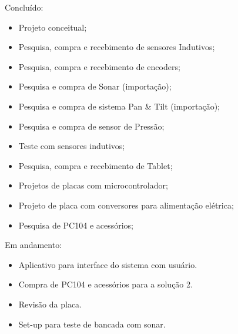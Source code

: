 Concluído:
\begin{itemize}
  \item Projeto conceitual;
  \item Pesquisa, compra e recebimento de sensores Indutivos;
  \item Pesquisa, compra e recebimento de encoders;
  \item Pesquisa e compra de Sonar (importação);
  \item Pesquisa e compra de sistema Pan & Tilt (importação);
  \item Pesquisa e compra de sensor de Pressão;
  \item Teste com sensores indutivos;
  \item Pesquisa, compra e recebimento de Tablet;
  \item Projetos de placas com microcontrolador;
  \item Projeto de placa com conversores para alimentação elétrica;
  \item Pesquisa de PC104 e acessórios;   
\end{itemize}
Em andamento:
\begin{itemize}
  \item Aplicativo para interface do sistema com usuário.
  \item Compra de PC104 e acessórios para a solução 2.
  \item Revisão da placa.
  \item Set-up para teste de bancada com sonar.
\end{itemize}